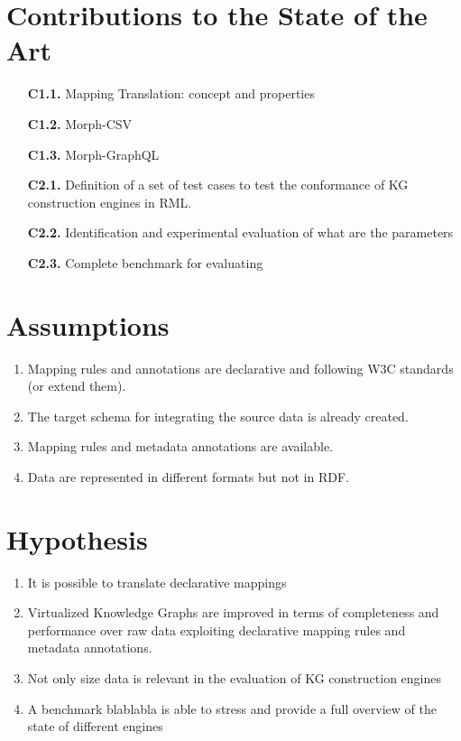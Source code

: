 \section{Contributions to the State of the Art}


\begin{enumerate}
    \item[\textbf{C1.1.}]  Mapping Translation: concept and properties
    \item[\textbf{C1.2.}] Morph-CSV 
    \item[\textbf{C1.3.}] Morph-GraphQL
    \item[\textbf{C2.1.}] Definition of a set of test cases to test the conformance of KG construction engines in RML.
    \item[\textbf{C2.2.}] Identification and experimental evaluation of what are the parameters
    \item[\textbf{C2.3.}] Complete benchmark for evaluating
\end{enumerate}

\section{Assumptions}

\begin{enumerate}[label=\textbf{A{\arabic*}}]
    \item Mapping rules and annotations are declarative and following W3C standards (or extend them). 
    \item The target schema for integrating the source data is already created.
    \item Mapping rules and metadata annotations are available.
    \item Data are represented in different formats but not in RDF.
\end{enumerate}

\section{Hypothesis}

\begin{enumerate}[label=\textbf{H{\arabic*}}]
    \item It is possible to translate declarative mappings
    \item Virtualized Knowledge Graphs are improved in terms of completeness and performance over raw data exploiting declarative mapping rules and metadata annotations.
    \item Not only size data is relevant in the evaluation of KG construction engines
    \item A benchmark blablabla is able to stress and provide a full overview of the state of different engines 
\end{enumerate}

